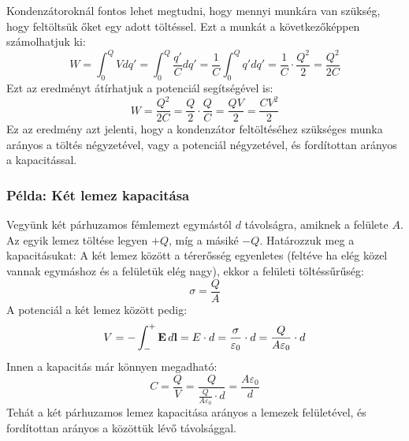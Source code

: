\documentclass[a4paper,12pt]{article}
\begin{document}
Kondenzátoroknál fontos lehet megtudni, hogy mennyi munkára van szükség, hogy feltöltsük őket egy adott töltéssel. Ezt a munkát a következőképpen számolhatjuk ki:
\begin{equation}
    W = \int_{0}^{Q} V dq' = \int_{0}^{Q} \frac{q'}{C} dq' = \frac{1}{C} \int_{0}^{Q} q' dq' = \frac{1}{C} \cdot \frac{Q^2}{2} = \frac{Q^2}{2C}
\end{equation}
Ezt az eredményt átírhatjuk a potenciál segítségével is:
\begin{equation}
    W = \frac{Q^2}{2C} = \frac{Q}{2} \cdot \frac{Q}{C} = \frac{Q V}{2} = \frac{C V^2}{2}
\end{equation}
Ez az eredmény azt jelenti, hogy a kondenzátor feltöltéséhez szükséges munka arányos a töltés négyzetével, vagy a potenciál négyzetével, és fordítottan arányos a kapacitással.

\subsubsection*{Példa: Két lemez kapacitása}
Vegyünk két párhuzamos fémlemezt egymástól $d$ távolságra, amiknek a felülete $A$. Az egyik lemez töltése legyen $+Q$, míg a másiké $-Q$. Határozzuk meg a kapacitásukat:
A két lemez között a térerősség egyenletes (feltéve ha elég közel vannak egymáshoz és a felületük elég nagy), ekkor a felületi töltéssűrűség:
\begin{equation}
    \sigma = \frac{Q}{A}
\end{equation}
A potenciál a két lemez között pedig:
\begin{equation}
    V = - \int_{-}^{+} \bold{E} \, d\bold{l} = E \cdot d = \frac{\sigma}{\varepsilon_0} \cdot d = \frac{Q}{A \varepsilon_0} \cdot d
\end{equation}
Innen a kapacitás már könnyen megadható:
\begin{equation}
    C = \frac{Q}{V} = \frac{Q}{\frac{Q}{A \varepsilon_0} \cdot d} = \frac{A \varepsilon_0}{d}
\end{equation}
Tehát a két párhuzamos lemez kapacitása arányos a lemezek felületével, és fordítottan arányos a közöttük lévő távolsággal.
\end{document}
